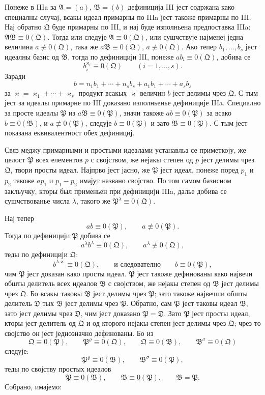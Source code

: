 ﻿\documentclass[11pt]{article}
\newcommand{\ideal}[1]{\mathfrak{#1}}
\begin{document}
Понеже в IIIa за \(\ideal A=(a)\), \(\ideal B=(b)\) дефиниција III јест содржана како специалны случај, всакы идеал примарны по IIIa јест такоже примарны по III. Нај обратно \(\ideal Q\) буде примарны по III, и нај буде изполньена предпоставка IIIa: \(\ideal A\ideal B\equiv0(\ideal Q)\). Тогда или следује \(\ideal A\equiv0(\ideal Q)\), или сушчствује најменеј једна величина \(a\not\equiv0(\ideal Q)\), така же \(a\ideal B\equiv0(\ideal Q)\), \(a\not\equiv0(\ideal Q)\). Ако тепер \(b_1,\ldots,b_s\) јест идеалны базис од \(\ideal B\), тогда по дефиницији III, понеже \(a b_i\equiv0(\ideal Q)\), добива се
\[
 b_i^{\varkappa_i}\equiv0(\ideal Q)\qquad (i=1,\ldots,s).
\]
Заради
\[
 b=n_1b_1+\cdots+n_s b_s+a_1b_1+\cdots+a_s b_s
\]
за \(\varkappa=\varkappa_1+\cdots+\varkappa_s\) продукт всакых \(\varkappa\) величин \(b\) јест делимы чрез \(\ideal Q\). С тым јест за идеалы примарне по III доказано изполньенье дефиниције IIIa. Специално за просте идеалы \(\ideal P\) из \(a\ideal B\equiv0(\ideal P)\), значи такоже \(a b\equiv0(\ideal P)\) за всако \(b\equiv0(\ideal B)\), и \(a\not\equiv0(\ideal P)\), следује \(b\equiv0(\ideal P)\) и зато \(\ideal B\equiv0(\ideal P)\). С тым јест показана еквивалентност обех дефинициј.

Связ меджу примарными и простыми идеалами устанавльа се приметкоју, же целост \(\ideal P\) всех елементов \(p\) с својством, же нејакы степен од \(p\) јест делимы чрез \(\ideal Q\), твори просты идеал. Најпрво јест јасно, же \(\ideal P\) јест идеал, понеже поред \(p_1\) и \(p_2\) такоже \(a p_1\) и \(p_1-p_2\) имајут названо својство. По том самом базисном закльучку, кторы был применьен при дефиницији IIIa, далье добива се сушчствованье числа \(\lambda\), такого же \(\ideal P^\lambda\equiv0(\ideal Q)\).

Нај тепер
\[
 a b\equiv0(\ideal P),\qquad a\not\equiv0(\ideal P).
\]
Тогда по дефиницији \(\ideal P\) добива се
\[
 a^\lambda b^\lambda\equiv0(\ideal Q),\qquad a^\lambda\not\equiv0(\ideal Q),
\]
теды по дефиницији \(\ideal Q\):
\[
 b^{\lambda\varkappa}\equiv0(\ideal Q),\qquad\text{и следователно}\qquad b\equiv0(\ideal P),
\]
чим \(\ideal P\) јест доказан како просты идеал. \(\ideal P\) јест такоже дефинованы како највечи обшты делитель всех идеалов \(\ideal B\) с својством, же нејакы степен од \(\ideal B\) јест делимы чрез \(\ideal Q\). Бо всакы таковы \(\ideal B\) јест делимы чрез \(\ideal P\); зато такоже највечши обшты делитель \(\ideal D\) тых \(\ideal B\) јест делимы чрез \(\ideal P\). Обратно, сам \(\ideal P\) јест таковы идеал \(\ideal B\), зато јест делимы чрез \(\ideal D\), чим јест доказано \(\ideal P=\ideal D\). Зато \(\ideal P\) јест просты идеал, кторы јест делитель од \(\ideal Q\) и од кторого нејакы степен јест делимы чрез \(\ideal Q\); чрез то својство он јест једнозначно дефинованы. Бо из
\[
 \ideal Q\equiv0(\ideal P),\qquad \ideal P^\varrho\equiv0(\ideal Q),
 \qquad
 \ideal Q\equiv0(\ideal B),\qquad \ideal B^\sigma\equiv0(\ideal Q)
\]
следује:
\[
 \ideal P^\varrho\equiv0(\ideal B),\qquad
 \ideal B^\sigma\equiv0(\ideal P),
\]
теды по својству простых идеалов
\[
 \ideal P\equiv0(\ideal B),\qquad \ideal B\equiv0(\ideal P),\qquad \ideal B=\ideal P.
\]
Собрано, имајемо:
\end{document}

